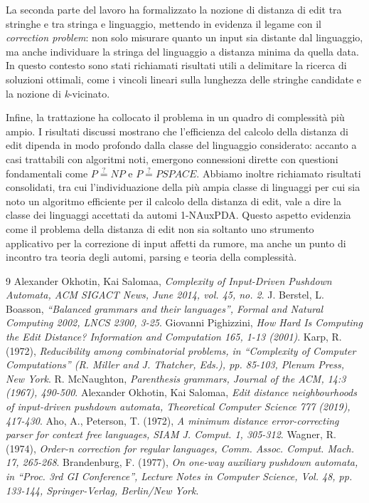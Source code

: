 \documentclass[a4paper,12pt]{report}
\theoremstyle{propositionstyle}
\begin{document}
    La seconda parte del lavoro ha formalizzato la nozione di distanza di edit tra stringhe e tra stringa e linguaggio, mettendo in evidenza il legame con il \textit{correction problem}: non solo misurare quanto un input sia distante dal linguaggio, ma anche individuare la stringa del linguaggio a distanza minima da quella data.
    In questo contesto sono stati richiamati risultati utili a delimitare la ricerca di soluzioni ottimali, come i vincoli lineari sulla lunghezza delle stringhe candidate e la nozione di \textit{k}-vicinato.

    Infine, la trattazione ha collocato il problema in un quadro di complessità più ampio.
    I risultati discussi mostrano che l’efficienza del calcolo della distanza di edit dipenda in modo profondo dalla classe del linguaggio considerato: accanto a casi trattabili con algoritmi noti, emergono connessioni dirette con questioni fondamentali come $P \stackrel{?}{=} NP$ e $P \stackrel{?}{=} PSPACE$.
    Abbiamo inoltre richiamato risultati consolidati, tra cui l’individuazione della più ampia classe di linguaggi per cui sia noto un algoritmo efficiente per il calcolo della distanza di edit, vale a dire la classe dei linguaggi accettati da automi 1-NAuxPDA\@.
    Questo aspetto evidenzia come il problema della distanza di edit non sia soltanto uno strumento applicativo per la correzione di input affetti da rumore, ma anche un punto di incontro tra teoria degli automi, parsing e teoria della complessità.

    \clearpage
    \begin{thebibliography}{9}
        Alexander Okhotin, Kai Salomaa,
        \textit{Complexity of Input-Driven Pushdown Automata, ACM SIGACT News, June 2014, vol. 45, no. 2}.
        J. Berstel, L. Boasson,
        \textit{“Balanced grammars and their languages”, Formal and Natural Computing 2002, LNCS 2300, 3-25}.
        Giovanni Pighizzini,
        \textit{How Hard Is Computing the Edit Distance? Information and Computation 165, 1-13 (2001)}.
        Karp, R. (1972),
        \textit{Reducibility among combinatorial problems, in “Complexity of Computer Computations” (R. Miller and J. Thatcher, Eds.), pp. 85-103, Plenum Press, New York}.
        R. McNaughton,
        \textit{Parenthesis grammars, Journal of the ACM, 14:3 (1967), 490-500}.
        Alexander Okhotin, Kai Salomaa,
        \textit{Edit distance neighbourhoods of input-driven pushdown automata, Theoretical Computer Science 777 (2019), 417-430}.
        Aho, A., Peterson, T. (1972),
        \textit{A minimum distance error-correcting parser for context free languages, SIAM J. Comput. 1, 305-312}.
        Wagner, R. (1974),
        \textit{Order-n correction for regular languages, Comm. Assoc. Comput. Mach. 17, 265-268}.
        Brandenburg, F. (1977),
        \textit{On one-way auxiliary pushdown automata, in “Proc. 3rd GI Conference”, Lecture Notes in Computer Science, Vol. 48, pp. 133-144, Springer-Verlag, Berlin/New York}.
    \end{thebibliography}
\end{document}
